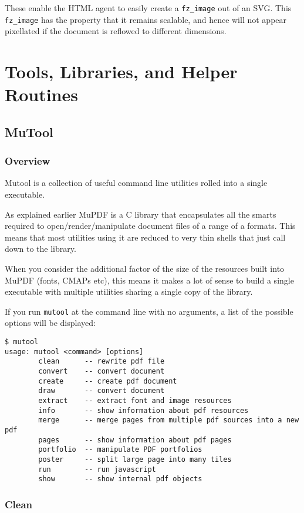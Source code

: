\documentclass[oneside]{book}
\begin{document}
These enable the HTML agent to easily create a \texttt{fz\_image} out of an SVG. This \texttt{fz\_image} has the property that it remains scalable, and hence will not appear pixellated if the document is reflowed to different dimensions.

\part{Tools, Libraries, and Helper Routines}
\chapter{MuTool}
\label{Mutool}

\section{Overview}

Mutool is a collection of useful command line utilities rolled into a single executable.

As explained earlier MuPDF is a C library that encapsulates all the smarts required to open/render/manipulate document files of a range of a formats. This means that most utilities using it are reduced to very thin shells that just call down to the library.

When you consider the additional factor of the size of the resources built into MuPDF (fonts, CMAPs etc), this means it makes a lot of sense to build a single executable with multiple utilities sharing a single copy of the library.

If you run \texttt{mutool} at the command line with no arguments, a list of the possible options will be displayed:

\begin{lstlisting}
$ mutool
usage: mutool <command> [options]
        clean      -- rewrite pdf file
        convert    -- convert document
        create     -- create pdf document
        draw       -- convert document
        extract    -- extract font and image resources
        info       -- show information about pdf resources
        merge      -- merge pages from multiple pdf sources into a new pdf
        pages      -- show information about pdf pages
        portfolio  -- manipulate PDF portfolios
        poster     -- split large page into many tiles
        run        -- run javascript
        show       -- show internal pdf objects
\end{lstlisting}

\section{Clean}
\end{document}
